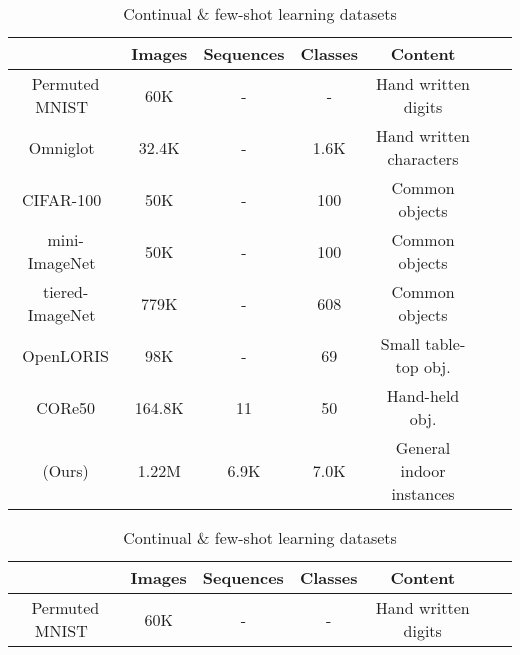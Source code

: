 \begin{table}[t]
\iflatexml
    \begin{tabular}{ccccccc}
    \toprule
                                  & {\bf Images} & {\bf Sequences} & {\bf Classes} & {\bf Content}                  \\
    \midrule                                                                     
    Permuted MNIST~\citep{mnist}   & 60K          & -           & -          & Hand written digits          \\
    Omniglot~\citep{omniglot}      & 32.4K        & -           & 1.6K       & Hand written characters      \\
    CIFAR-100~\citep{cifar}        & 50K          & -           & 100        & Common objects               \\
    mini-ImageNet~\citep{matchingnet}& 50K        & -           & 100        & Common objects               \\
    tiered-ImageNet~\citep{fewshotssl}& 779K      & -           & 608        & Common objects               \\
    OpenLORIS  \citep{openloris}   & 98K          & -           & 69         & Small table-top obj.         \\
    CORe50  \citep{core50}         & 164.8K       & 11          & 50         & Hand-held obj.               \\
    \midrule                                                                                                          
    \ourroom{} (Ours)            & 1.22M         & 6.9K        & 7.0K       & General indoor instances     \\
    \bottomrule
    \end{tabular}
    \caption{\small Continual \& few-shot learning datasets}
    \label{tab:dataset_stats}
\else
    \vspace{-0.5in}
    \begin{center}
    \begin{small}
    \caption{\small Continual \& few-shot learning datasets}
    \label{tab:dataset_stats}
    \begin{tabular}{ccccccc}
    \toprule
                                  & {\bf Images} & {\bf Sequences} & {\bf Classes} & {\bf Content}                  \\
    \midrule                                                                     
    Permuted MNIST~\citep{mnist}   & 60K          & -           & -          & Hand written digits          \\

\end{tabular}
\end{small}
\end{center}
\end{table}

